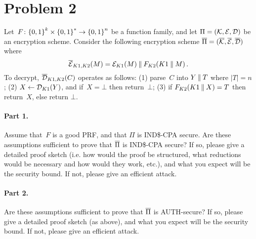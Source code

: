 \documentclass[11pt]{article}
\begin{document}
\vspace*{-.25in}
\section*{Problem 2} Let~$F \colon {\{0,1\}}^k \times {\{0,1\}}^* \to {\{0,1\}}^n$
be a function family, and let $\Pi = ({\cal K},{\cal E},{\cal D})$ be an
encryption scheme.  Consider the following encryption scheme $\overline{\Pi} =
(\overline{\mathcal{K}},\overline{\mathcal{E}},\overline{\mathcal{D}})$ where 
\[
\overline{\mathcal{E}}_{K1,K2}(M) = {\cal E}_{K1}(M)\:\|\: F_{K2}(K1 \:\|\: M)\, .
\]  
To decrypt, $\overline{\mathcal{D}}_{K1,K2}(C)$
operates as follows: (1) parse~$C$ into $Y \:\|\: T$ where $|T|=n$; (2) $X
\gets {\cal D}_{K1}(Y)$, and if~$X = \bot$ then return~$\bot$; (3) if
$F_{K2}(K1 \:\|\: X)=T$ then return~$X$, else return $\bot$.

\paragraph{Part 1.} Assume that~$F$ is a good PRF, and that $\Pi$ is IND\$-CPA secure.
Are these assumptions sufficient to prove that $\overline{\Pi}$ is IND\$-CPA
secure?  If so, please give a detailed proof sketch (i.e. how would
the proof be structured, what reductions would be necessary and how
would they work, etc.), and what you expect will be the security
bound.  If not, please give an efficient attack.

\paragraph{Part 2.} Are these assumptions sufficient to prove that $\overline{\Pi}$ is AUTH-secure?
If so, please give a detailed proof sketch (as above), and what you
expect will be the security bound.  If not, please give an efficient attack.
\end{document}

